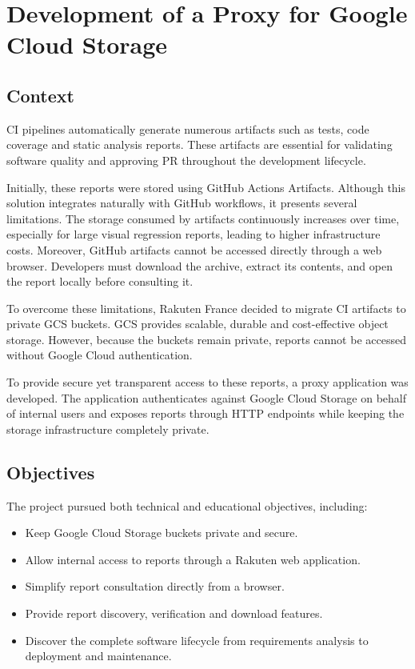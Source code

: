 \section{Development of a Proxy for Google Cloud Storage}
\label{sec:gcs-proxy}

\subsection{Context}
\acf{CI} pipelines automatically generate numerous artifacts such as tests, code coverage and static analysis reports. These artifacts are essential for validating software quality and approving \acs{PR} throughout the development lifecycle.

Initially, these reports were stored using GitHub Actions Artifacts. Although this solution integrates naturally with GitHub workflows, it presents several limitations. The storage consumed by artifacts continuously increases over time, especially for large visual regression reports, leading to higher infrastructure costs. Moreover, GitHub artifacts cannot be accessed directly through a web browser. Developers must download the archive, extract its contents, and open the report locally before consulting it.

To overcome these limitations, Rakuten France decided to migrate \ac{CI} artifacts to private \acf{GCS} buckets. \ac{GCS} provides scalable, durable and cost-effective object storage. However, because the buckets remain private, reports cannot be accessed without Google Cloud authentication.

To provide secure yet transparent access to these reports, a proxy application was developed. The application authenticates against Google Cloud Storage on behalf of internal users and exposes reports through \acs{HTTP} endpoints while keeping the storage infrastructure completely private.

\subsection{Objectives}

The project pursued both technical and educational objectives, including:

\begin{itemize}
\item Keep Google Cloud Storage buckets private and secure.
\item Allow internal access to reports through a Rakuten web application.
\item Simplify report consultation directly from a browser.
\item Provide report discovery, verification and download features.
\item Discover the complete software lifecycle from requirements analysis to deployment and maintenance.
\end{itemize}

